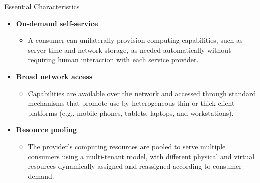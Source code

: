 \documentclass{SKP-beamer}
\begin{document}
\begin{frame}{ Essential Characteristics}
	\begin{itemize}
		
		\item  \textbf{On-demand self-service}
		        	\begin{itemize}
		        	
		        	\item A consumer can unilaterally provision computing capabilities, such as server time and network storage, as 
		        	needed automatically without requiring human interaction with each service provider.
		        	
		        \end{itemize}
		\item \textbf{Broad network access}
		        \begin{itemize}
		        	
		        	\item Capabilities are available over the network and accessed through standard mechanisms that promote use by 
		        	heterogeneous thin or thick client platforms (e.g., mobile phones, tablets, laptops, and workstations).
		        \end{itemize}
		\item \textbf{Resource pooling}
		          \begin{itemize}
		          	
		          	\item The provider’s computing resources are pooled to serve multiple consumers using a multi-tenant model, 
		          	with different physical and virtual resources dynamically assigned and reassigned according to consumer 
		          	demand.
		          	
		          \end{itemize}
	\end{itemize}
\end{frame}
\end{document}
